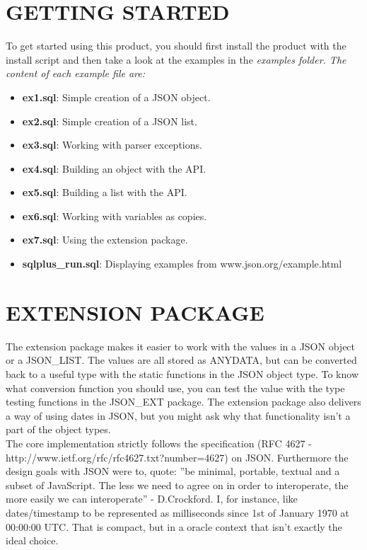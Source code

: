 \documentclass[11pt,twocolumn, a4paper]{article}
\begin{document}
\section*{GETTING STARTED}
To get started using this product, you should first install the product with the install script and then take a look at the examples in the \em examples \em folder. The content of each example file are:
\begin{itemize}
\item \textbf{ex1.sql}: Simple creation of a JSON object. 
\item \textbf{ex2.sql}: Simple creation of a JSON list. 
\item \textbf{ex3.sql}: Working with parser exceptions.
\item \textbf{ex4.sql}: Building an object with the API.
\item \textbf{ex5.sql}: Building a list with the API.
\item \textbf{ex6.sql}: Working with variables as copies.
\item \textbf{ex7.sql}: Using the extension package.
\item \textbf{sqlplus\_run.sql}: Displaying examples from www.json.org/example.html
\end{itemize}

\section*{EXTENSION PACKAGE}
The extension package makes it easier to work with the values in a JSON object or a JSON\_LIST. The values are all stored as ANYDATA, but can be converted back to a useful type with the static functions in the JSON object type. To know what conversion function you should use, you can test the value with the type testing functions in the JSON\_EXT package. The extension package also delivers a way of using dates in JSON, but you might ask why that functionality isn't a part of the object types. \\
The core implementation strictly follows the specification (RFC 4627 - http://www.ietf.org/rfc/rfc4627.txt?number=4627) on JSON. Furthermore the design goals with JSON were to, quote: ''be minimal, portable, textual and a subset of JavaScript. The less we need to agree on in order to interoperate, the more easily we can interoperate'' - D.Crockford. I, for instance, like dates/timestamp to be represented as milliseconds since 1st of January 1970 at 00:00:00 UTC. That is compact, but in a oracle context that isn't exactly the ideal choice. 
\end{document}
